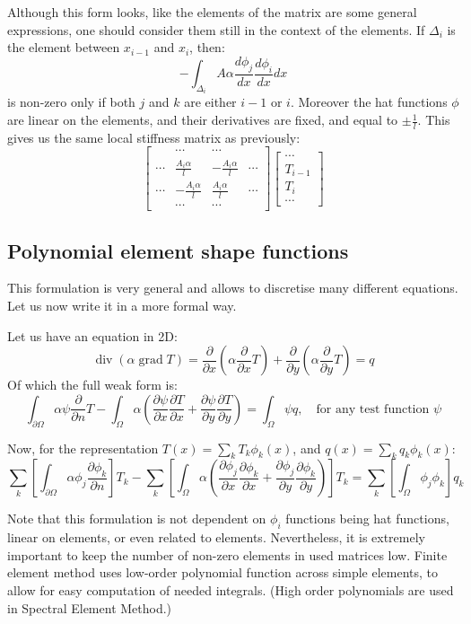 \documentclass{article}
\newcommand{\mat}[1]{\left[\begin{matrix}#1\end{matrix}\right]}
\DeclareMathOperator{\dive}{div}
\DeclareMathOperator{\grad}{grad}
\newcommand{\rr}[2]{\frac{\partial #1}{\partial #2}}
\newcommand{\pr}[1]{\frac{\partial}{\partial #1}}
\begin{document}
Although this form looks, like the elements of the matrix are some general expressions, one should consider them still in the context of the elements. If $\Delta_i$ is the element between $x_{i-1}$ and $x_i$, then:
\[-\int_{\Delta_i} A\alpha\frac{d\phi_j}{dx}\frac{d\phi_i}{dx}dx\]
is non-zero only if both $j$ and $k$ are either $i-1$ or $i$. Moreover the hat functions $\phi$ are linear on the elements, and their derivatives are fixed, and equal to $\pm\frac{1}{l}$. This gives us the same local stiffness matrix as previously:
\[\mat{ & \cdots & \cdots & \\
\cdots & \frac{A_i\alpha}{l} & -\frac{A_i\alpha}{l} & \cdots \\
\cdots & -\frac{A_i\alpha}{l} & \frac{A_i\alpha}{l} & \cdots \\
 & \cdots & \cdots & }\mat{\cdots\\T_{i-1}\\T_i\\\cdots}\]

\subsection{Polynomial element shape functions}

This formulation is very general and allows to discretise many different equations. Let us now write it in a more formal way.

Let us have an equation in 2D:
\[\dive{\left(\alpha\grad{T}\right)} = \pr{x}\left(\alpha\pr{x}T\right) + \pr{y}\left(\alpha\pr{y}T\right) = q\]
Of which the full weak form is:
\[\int_{\partial\Omega}\alpha\psi\pr{n}T-\int_\Omega\alpha\left(\rr{\psi}{x}\rr{T}{x} + \rr{\psi}{y}\rr{T}{y}\right) = \int_\Omega\psi q,\quad\text{for any test function }\psi\]

Now, for the representation $T(x)=\sum_k T_k\phi_k(x)$, and $q(x)=\sum_k q_k\phi_k(x)$:
\[\sum_k\left[\int_{\partial\Omega}\alpha\phi_j\rr{\phi_k}{n}\right]T_k-\sum_k\left[\int_\Omega\alpha\left(\rr{\phi_j}{x}\rr{\phi_k}{x} + \rr{\phi_j}{y}\rr{\phi_k}{y}\right)\right]T_k = \sum_k\left[\int_\Omega\phi_j\phi_k\right]q_k\]

Note that this formulation is not dependent on $\phi_i$ functions being hat functions, linear on elements, or even related to elements. Nevertheless, it is extremely important to keep the number of non-zero elements in used matrices low. Finite element method uses low-order polynomial function across simple elements, to allow for easy computation of needed integrals. (High order polynomials are used in Spectral Element Method.)
\end{document}
